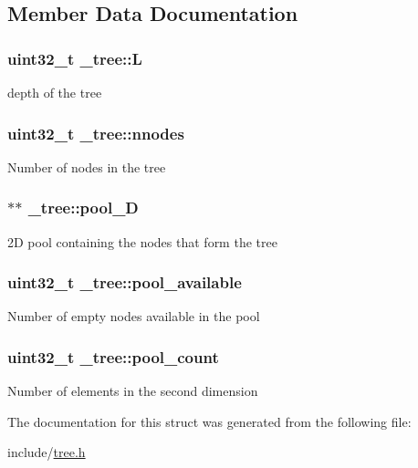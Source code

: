 \subsection{Member Data Documentation}
\hypertarget{struct__tree_a36ca6c909dd7c119452da0cb49e2c829}{
\subsubsection[{L}]{\setlength{\rightskip}{0pt plus 5cm}uint32\+\_\+t \+\_\+tree\+::\+L}}\label{struct__tree_a36ca6c909dd7c119452da0cb49e2c829}
depth of the tree \hypertarget{struct__tree_abffdcd9dcf0df92df4b5444fb74cc523}{
\subsubsection[{nnodes}]{\setlength{\rightskip}{0pt plus 5cm}uint32\+\_\+t \+\_\+tree\+::nnodes}}\label{struct__tree_abffdcd9dcf0df92df4b5444fb74cc523}
Number of nodes in the tree \hypertarget{struct__tree_a2783a2aaf32fc3b3c9de8b9fbb14de58}{
\subsubsection[{pool\+\_\+2\+D}]{$\ast$$\ast$ \+\_\+tree\+::pool\+\_\+D}}\label{struct__tree_a2783a2aaf32fc3b3c9de8b9fbb14de58}
2\+D pool containing the nodes that form the tree \hypertarget{struct__tree_afd3769cd9db40fa460d35a0033fb7d02}{
\subsubsection[{pool\+\_\+available}]{\setlength{\rightskip}{0pt plus 5cm}uint32\+\_\+t \+\_\+tree\+::pool\+\_\+available}}\label{struct__tree_afd3769cd9db40fa460d35a0033fb7d02}
Number of empty nodes available in the pool \hypertarget{struct__tree_aa90c2b558fc833fc22bcd6617689a41f}{
\subsubsection[{pool\+\_\+count}]{\setlength{\rightskip}{0pt plus 5cm}uint32\+\_\+t \+\_\+tree\+::pool\+\_\+count}}\label{struct__tree_aa90c2b558fc833fc22bcd6617689a41f}
Number of elements in the second dimension 

The documentation for this struct was generated from the following file\+:\begin{DoxyCompactItemize}
\item 
include/\hyperlink{tree_8h}{tree.\+h}\end{DoxyCompactItemize}
